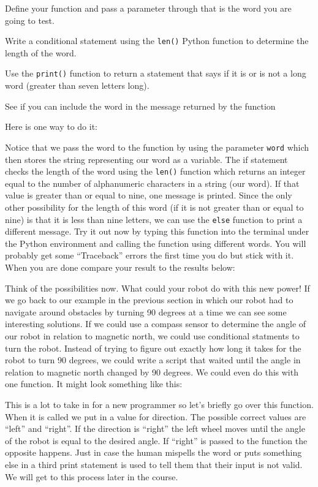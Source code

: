 \documentclass[
]{book}
\begin{document}
Define your function and pass a parameter through that is the word you are going to test.

Write a conditional statement using the \texttt{len()} Python function to determine the length of the word.

Use the \texttt{print()} function to return a statement that says if it is or is not a long word (greater than seven letters long).

See if you can include the word in the message returned by the function

Here is one way to do it:

Notice that we pass the word to the function by using the parameter \texttt{word} which then stores the string representing our word as a variable. The if statement checks the length of the word using the \texttt{len()} function which returns an integer equal to the number of alphanumeric characters in a string (our word). If that value is greater than or equal to nine, one message is printed. Since the only other possibility for the length of this word (if it is not greater than or equal to nine) is that it is less than nine letters, we can use the \texttt{else} function to print a different message. Try it out now by typing this function into the terminal under the Python environment and calling the function using different words. You will probably get some ``Traceback'' errors the first time you do but stick with it. When you are done compare your result to the results below:

Think of the possibilities now. What could your robot do with this new power! If we go back to our example in the previous section in which our robot had to navigate around obstacles by turning 90 degrees at a time we can see some interesting solutions. If we could use a compass sensor to determine the angle of our robot in relation to magnetic north, we could use conditional statments to turn the robot. Instead of trying to figure out exactly how long it takes for the robot to turn 90 degrees, we could write a script that waited until the angle in relation to magnetic north changed by 90 degrees. We could even do this with one function. It might look something like this:

This is a lot to take in for a new programmer so let's briefly go over this function. When it is called we put in a value for direction. The possible correct values are ``left'' and ``right''. If the direction is ``right'' the left wheel moves until the angle of the robot is equal to the desired angle. If ``right'' is passed to the function the opposite happens. Just in case the human mispells the word or puts something else in a third print statement is used to tell them that their input is not valid. We will get to this process later in the course.
\end{document}
